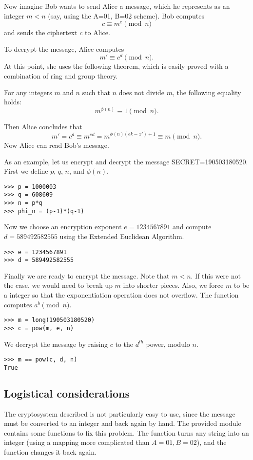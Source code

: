 Now imagine Bob wants to send Alice a message, which he represents as an integer $m<n$ (say, using the A=01, B=02 scheme).
Bob computes 
\[
c \equiv m^e \pmod{n}
\]
and sends the ciphertext $c$ to Alice.

To decrypt the message, Alice computes
\[
m' \equiv c^d \pmod{n}.
\]
At this point, she uses the following theorem, which is easily proved with a combination of ring and group theory.
\begin{theorem}
For any integers $m$ and $n$ such that $n$ does not divide $m$, the following equality holds:
\[
m^{\phi(n)}\equiv 1 \pmod{n}.
\]
\end{theorem}
Then Alice concludes that
\[
m' = c^d \equiv m^{ed} = m^{\phi(n)(ek-x')+1} \equiv m \pmod{n}.
\]
Now Alice can read Bob's message.

As an example, let us encrypt and decrypt the message SECRET=190503180520.
First we define $p$, $q$, $n$, and $\phi(n)$.
\begin{lstlisting}
>>> p = 1000003
>>> q = 608609
>>> n = p*q
>>> phi_n = (p-1)*(q-1)
\end{lstlisting}

Now we choose an encryption exponent $e = 1234567891$ and compute $d = 589492582555$ using the Extended Euclidean Algorithm.
\begin{lstlisting}
>>> e = 1234567891
>>> d = 589492582555
\end{lstlisting}

Finally we are ready to encrypt the message. 
Note that $m<n$. If this were not the case, we would need to break up $m$ into shorter pieces.
Also, we force $m$ to be a  integer so that the exponentiation operation does not overflow.
The function  computes $a^b \pmod{n}$.
\begin{lstlisting}
>>> m = long(190503180520)
>>> c = pow(m, e, n)
\end{lstlisting}

We decrypt the message by raising $c$ to the $d^{th}$ power, modulo $n$.
\begin{lstlisting}
>>> m == pow(c, d, n)
True
\end{lstlisting}

\subsection*{Logistical considerations}
The cryptosystem described is not particularly easy to use, since the message must be converted to an integer and back again by hand.
The provided  module contains some functions to fix this problem.
The function  turns any string into an integer (using a mapping more complicated than $A=01, B=02$), and the function  changes it back again.

